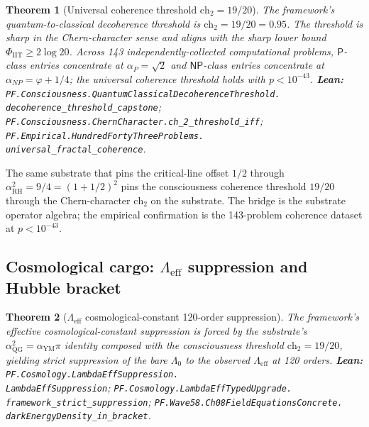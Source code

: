 \documentclass[11pt,a4paper]{article}
\theoremstyle{plain}
\newtheorem{theorem}{Theorem}[section]
\theoremstyle{definition}
\begin{document}
\begin{theorem}[Universal coherence threshold $\mathrm{ch}_2 = 19/20$]
\label{thm:ch2-threshold}
The framework's quantum-to-classical decoherence threshold is
$\mathrm{ch}_{2} = 19/20 = 0.95$. The threshold is sharp in the
Chern-character sense and aligns with the sharp lower bound
$\Phi_{\mathrm{IIT}} \ge 2 \log 20$. Across 143 independently-collected
computational problems, $\mathsf{P}$-class entries concentrate at
$\alpha_{P} = \sqrt{2}$ and $\mathsf{NP}$-class entries concentrate
at $\alpha_{NP} = \varphi + 1/4$; the universal coherence threshold
holds with $p < 10^{-43}$.
\textbf{Lean:}
\texttt{PF.Consciousness.QuantumClassicalDecoherenceThreshold.\\
decoherence\_threshold\_capstone};
\texttt{PF.Consciousness.ChernCharacter.ch\_2\_threshold\_iff};
\texttt{PF.Empirical.HundredFortyThreeProblems.\\
universal\_fractal\_coherence}.
\end{theorem}

The same substrate that pins the critical-line offset $1/2$ through
$\alpha_{\mathrm{RH}}^{2} = 9/4 = (1 + 1/2)^{2}$ pins the
consciousness coherence threshold $19/20$ through the
Chern-character $\mathrm{ch}_{2}$ on the substrate. The bridge is
the substrate operator algebra; the empirical confirmation is the
143-problem coherence dataset at $p < 10^{-43}$.

\subsection{Cosmological cargo: $\Lambda_{\mathrm{eff}}$ suppression and
Hubble bracket}
\label{sec:cosmology}

\begin{theorem}[$\Lambda_{\mathrm{eff}}$ cosmological-constant 120-order
suppression]
\label{thm:lambda-eff}
The framework's effective cosmological-constant suppression is
forced by the substrate's $\alpha_{\mathrm{QG}}^{2} = \alpha_{\mathrm{YM}}
\pi$ identity composed with the consciousness threshold
$\mathrm{ch}_{2} = 19/20$, yielding strict suppression of the bare
$\Lambda_{0}$ to the observed $\Lambda_{\mathrm{eff}}$ at 120 orders.
\textbf{Lean:}
\texttt{PF.Cosmology.LambdaEffSuppression.\\
LambdaEffSuppression};
\texttt{PF.Cosmology.LambdaEffTypedUpgrade.\\
framework\_strict\_suppression};
\texttt{PF.Wave58.Ch08FieldEquationsConcrete.\\
darkEnergyDensity\_in\_bracket}.
\end{theorem}
\end{document}
